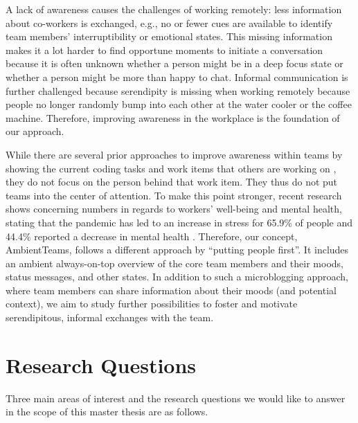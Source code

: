 A lack of awareness causes the challenges of working remotely: less information about co-workers is exchanged, e.g., no or fewer cues are available to identify team members' interruptibility or emotional states. This missing information makes it a lot harder to find opportune moments to initiate a conversation because it is often unknown whether a person might be in a deep focus state or whether a person might be more than happy to chat. Informal communication is further challenged because serendipity is missing when working remotely because people no longer randomly bump into each other at the water cooler or the coffee machine. Therefore, improving awareness in the workplace is the foundation of our approach.

While there are several prior approaches to improve awareness within teams by showing the current coding tasks and work items that others are working on \autocite{biehl2007fastdash, jakobsen2009wipdash}, they do not focus on the person behind that work item. They thus do not put teams into the center of attention. To make this point stronger, recent research shows concerning numbers in regards to workers' well-being and mental health, stating that the pandemic has led to an increase in stress for 65.9\% of people and 44.4\% reported a decrease in mental health \autocite{qualtricksmental}. Therefore, our concept, AmbientTeams, follows a different approach by \enquote{putting people first}. It includes an ambient always-on-top overview of the core team members and their moods, status messages, and other states. In addition to such a microblogging approach, where team members can share information about their moods (and potential context), we aim to study further possibilities to foster and motivate serendipitous, informal exchanges with the team.



\section{Research Questions}
\label{section:research_questions}
Three main areas of interest and the research questions we would like to answer in the scope of this master thesis are as follows.

